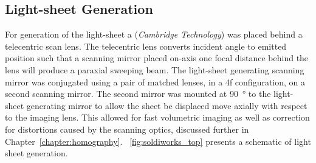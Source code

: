 \subsection{Light-sheet Generation}

For generation of the \gls{light-sheet} a  (\emph{Cambridge Technology}) was placed behind a \gls{telecentric} scan lens.
The \gls{telecentric} lens converts incident angle to emitted position such that a scanning mirror placed on-axis one focal distance behind the lens will produce a paraxial sweeping beam.
The \gls{light-sheet} generating scanning mirror was conjugated using a pair of matched lenses, in a \gls{4f} configuration, on a second scanning mirror.
The second mirror was mounted at \SI{90}{\degree} to the light-sheet generating mirror to allow the sheet be displaced move axially with respect to the imaging lens.
This allowed for fast volumetric imaging as well as correction for distortions caused by the scanning optics, discussed further in Chapter~\ref{chapter:homography}.
\figurename~\ref{fig:soldiworks_top} presents a schematic of light sheet generation.


%


